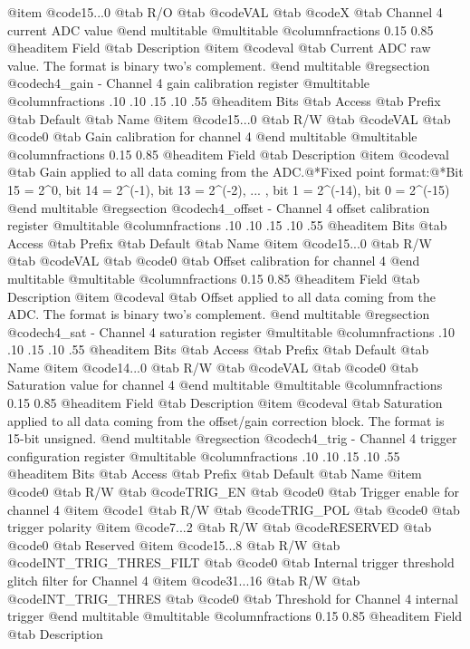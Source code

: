 @item @code{15...0}
@tab R/O @tab
@code{VAL}
@tab @code{X} @tab 
Channel 4 current ADC value
@end multitable
@multitable @columnfractions 0.15 0.85
@headitem Field @tab Description
@item @code{val} @tab Current ADC raw value. The format is binary two's complement.
@end multitable
@regsection @code{ch4_gain} - Channel 4 gain calibration register
@multitable @columnfractions .10 .10 .15 .10 .55
@headitem Bits @tab Access @tab Prefix @tab Default @tab Name
@item @code{15...0}
@tab R/W @tab
@code{VAL}
@tab @code{0} @tab 
Gain calibration for channel 4
@end multitable
@multitable @columnfractions 0.15 0.85
@headitem Field @tab Description
@item @code{val} @tab Gain applied to all data coming from the ADC.@*Fixed point format:@*Bit 15 = 2^0, bit 14 = 2^(-1), bit 13 = 2^(-2), ... , bit 1 = 2^(-14), bit 0 = 2^(-15)
@end multitable
@regsection @code{ch4_offset} - Channel 4 offset calibration register
@multitable @columnfractions .10 .10 .15 .10 .55
@headitem Bits @tab Access @tab Prefix @tab Default @tab Name
@item @code{15...0}
@tab R/W @tab
@code{VAL}
@tab @code{0} @tab 
Offset calibration for channel 4
@end multitable
@multitable @columnfractions 0.15 0.85
@headitem Field @tab Description
@item @code{val} @tab Offset applied to all data coming from the ADC. The format is binary two's complement.
@end multitable
@regsection @code{ch4_sat} - Channel 4 saturation register
@multitable @columnfractions .10 .10 .15 .10 .55
@headitem Bits @tab Access @tab Prefix @tab Default @tab Name
@item @code{14...0}
@tab R/W @tab
@code{VAL}
@tab @code{0} @tab 
Saturation value for channel 4
@end multitable
@multitable @columnfractions 0.15 0.85
@headitem Field @tab Description
@item @code{val} @tab Saturation applied to all data coming from the offset/gain correction block. The format is 15-bit unsigned.
@end multitable
@regsection @code{ch4_trig} - Channel 4 trigger configuration register
@multitable @columnfractions .10 .10 .15 .10 .55
@headitem Bits @tab Access @tab Prefix @tab Default @tab Name
@item @code{0}
@tab R/W @tab
@code{TRIG_EN}
@tab @code{0} @tab 
Trigger enable for channel 4
@item @code{1}
@tab R/W @tab
@code{TRIG_POL}
@tab @code{0} @tab 
trigger polarity
@item @code{7...2}
@tab R/W @tab
@code{RESERVED}
@tab @code{0} @tab 
Reserved
@item @code{15...8}
@tab R/W @tab
@code{INT_TRIG_THRES_FILT}
@tab @code{0} @tab 
Internal trigger threshold glitch filter for Channel 4
@item @code{31...16}
@tab R/W @tab
@code{INT_TRIG_THRES}
@tab @code{0} @tab 
Threshold for Channel 4 internal trigger
@end multitable
@multitable @columnfractions 0.15 0.85
@headitem Field @tab Description
